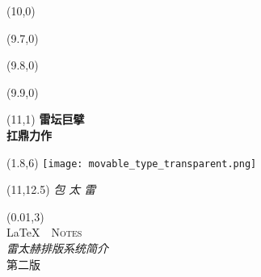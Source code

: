 \begin{titlepage}

\setlength\parindent{0pt}


\begin{textblock}{6}(10,0)
    \rule{0mm}{420mm}
\end{textblock}

\begin{textblock}{.02}(9.7,0)
    \rule{0mm}{420mm}
\end{textblock}

\begin{textblock}{.02}(9.8,0)
    \rule{0mm}{420mm}
\end{textblock}

\begin{textblock}{.02}(9.9,0)
    \rule{0mm}{420mm}
\end{textblock}

\begin{textblock}{3}(11,1)
    {\Huge \textbf{雷坛巨擘}\\[5pt] \textbf{扛鼎力作}}
\end{textblock}

\begin{textblock}{12}(1.8,6)
\textblockcolour{}
    \texttt{[image: movable\_type\_transparent.png]}
\end{textblock}

\begin{textblock}{4}(11,12.5)
    {\huge \textit{包 太 雷}}\\[5pt]
    {\Large \lnotesdate}
\end{textblock}

\TPshowboxestrue
\setlength\TPboxrulesize{0.8pt}

\begin{textblock}{14}(0.01,3)
    \centering
    ~\\[20pt]
    {\fontsize{32}{40}\selectfont \LaTeX\ \ \textsc{Notes}}\\[8pt]
    {\huge \textit{雷太赫排版系统简介}}\\[8pt]
    第二版\ \ \lnotesversion\\[20pt]
\end{textblock}
~
\end{titlepage}

\newpage
\thispagestyle{empty}
~

